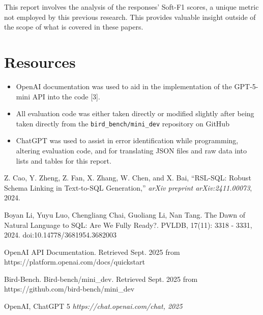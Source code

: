 \documentclass[11pt]{article}
\begin{document}
This report involves the analysis of the responses' Soft-F1 scores, a unique metric not employed by this previous research. This provides valuable insight outside of the scope of what is covered in these papers. 

\section{Resources}

\begin{itemize}
\item OpenAI documentation was used to aid in the implementation of the GPT-5-mini API into the code [3].
\item All evaluation code was either taken directly or modified slightly after being taken directly from the \texttt{bird\_bench/mini\_dev} repository on GitHub
\item ChatGPT was used to assist in error identification while programming, altering evaluation code, and for translating JSON files and raw data into lists and tables for this report.
\end{itemize}

\begin{thebibliography}{9}

Z. Cao, Y. Zheng, Z. Fan, X. Zhang, W. Chen, and X. Bai, 
``RSL-SQL: Robust Schema Linking in Text-to-SQL Generation,'' 
\textit{arXiv preprint arXiv:2411.00073}, 2024.

Boyan Li, Yuyu Luo, Chengliang Chai, Guoliang Li, Nan Tang. The Dawn
of Natural Language to SQL: Are We Fully Ready?. PVLDB, 17(11): 3318 -
3331, 2024.
doi:10.14778/3681954.3682003

OpenAI API Documentation. Retrieved Sept. 2025 from https://platform.openai.com/docs/quickstart 

Bird-Bench. Bird-bench/mini\_dev. Retrieved Sept. 2025 from https://github.com/bird-bench/mini\_dev 

OpenAI, ChatGPT 5 \textit{ https://chat.openai.com/chat, 2025}

\end{thebibliography}
\end{document}
